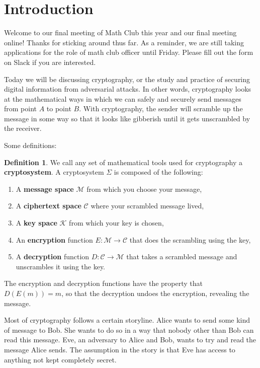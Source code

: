 \documentclass{article}
\theoremstyle{definition}
\newtheorem{definition}{Definition}%
\theoremstyle{remark}
\begin{document}
\section{Introduction}

    Welcome to our final meeting of Math Club this year and our final meeting online!
    Thanks for sticking around thus far.
    As a reminder, we are still taking applications for the role of math club officer until Friday.
    Please fill out the form on Slack if you are interested.

    Today we will be discussing cryptography, or the study and practice of securing digital information from adversarial attacks.
    In other words, cryptography looks at the mathematical ways in which we can safely and securely send messages from point \(A\) to point \(B\).
    With cryptography, the sender will scramble up the message in some way so that it looks like gibberish until it gets unscrambled by the receiver.

    Some definitions:
    \begin{definition}
        We call any set of mathematical tools used for cryptography a \textbf{cryptosystem}.
        A cryptosystem \(\Sigma\) is composed of the following:
        \begin{enumerate}
            \item A \textbf{message space} \(\mathcal{M}\) from which you choose your message,
            \item A \textbf{ciphertext space} \(\mathcal{C}\) where your scrambled message lived,
            \item A \textbf{key space} \(\mathcal{K}\) from which your key is chosen,
            \item An \textbf{encryption} function \(E:\mathcal{M}\to \mathcal{C}\) that does the scrambling using the key,
            \item A \textbf{decryption} function \(D:\mathcal{C}\to \mathcal{M}\) that takes a scrambled message and unscrambles it using the key.
        \end{enumerate}
        The encryption and decryption functions have the property that \(D(E(m))=m\), so that the decryption undoes the encryption, revealing the message.
    \end{definition}

    Most of cryptography follows a certain storyline.
    Alice wants to send some kind of message to Bob.
    She wants to do so in a way that nobody other than Bob can read this message.
    Eve, an adversary to Alice and Bob, wants to try and read the message Alice sends.
    The assumption in the story is that Eve has access to anything not kept completely secret.
\end{document}
